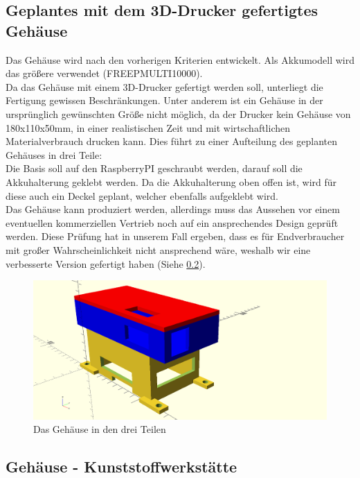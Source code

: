 \documentclass[12pt,a4paper]{article}
\begin{document}
\subsection{Geplantes mit dem 3D-Drucker gefertigtes Gehäuse}

Das Gehäuse wird nach den vorherigen Kriterien entwickelt.  Als Akkumodell wird das größere verwendet (FREEPMULTI10000).\\
Da das Gehäuse mit einem 3D-Drucker gefertigt werden soll, unterliegt die Fertigung gewissen Beschränkungen. Unter anderem ist ein Gehäuse in der ursprünglich gewünschten Größe nicht möglich, da der Drucker kein Gehäuse von 180x110x50mm, in einer realistischen Zeit und mit wirtschaftlichen Materialverbrauch drucken kann. Dies führt zu einer Aufteilung des geplanten Gehäuses in drei Teile: \\
Die Basis soll auf den RaspberryPI geschraubt werden, darauf soll die Akkuhalterung geklebt werden. Da die Akkuhalterung oben offen ist, wird für diese auch ein Deckel geplant, welcher ebenfalls aufgeklebt wird. \\
Das Gehäuse kann produziert werden, allerdings muss das Aussehen vor einem eventuellen kommerziellen Vertrieb noch auf ein ansprechendes Design geprüft werden. Diese Prüfung hat in unserem Fall ergeben, dass es für Endverbraucher mit großer Wahrscheinlichkeit nicht ansprechend wäre, weshalb wir eine verbesserte Version gefertigt haben (Siehe \ref{SUBSEC:KUNST}).

\begin{figure}[H]
  \centering
		\includegraphics[scale=0.6, angle=90]{graphics/gehaeuse.png}
		\caption{Das Gehäuse in den drei Teilen}
		\label{fig:case-3D}
\end{figure}

\newpage
\subsection{Gehäuse - Kunststoffwerkstätte}
\label{SUBSEC:KUNST}
\end{document}
